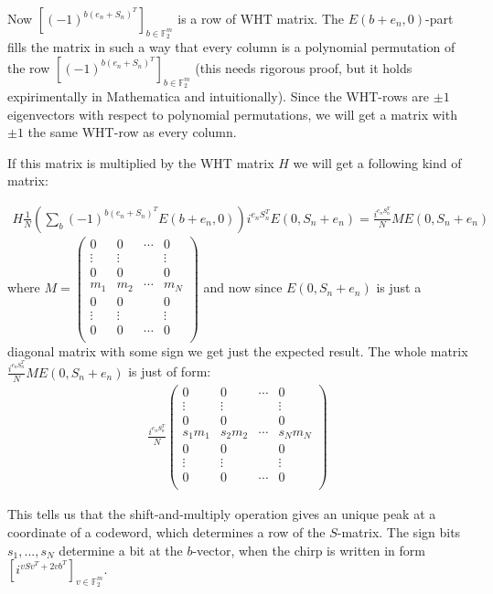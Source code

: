 \documentclass{article}
\begin{document}
	Now 
	$\left[(-1)^{b(e_n+S_n)^T}\right]_{b \in \mathbb{F}_2^m}$ is a row of WHT matrix. 
	The $E(b+e_n,0)$-part fills the matrix in such a way that every column is a polynomial permutation of the row $\left[(-1)^{b(e_n+S_n)^T}\right]_{b \in \mathbb{F}_2^m}$ (this needs rigorous proof, but it holds expirimentally in Mathematica and intuitionally). Since the WHT-rows are $\pm 1$ eigenvectors with respect to polynomial permutations, we will get a matrix with $\pm 1$ the same WHT-row as every column. \newpage 
	
	If this matrix is multiplied by the WHT matrix $H$ we will get a following kind of matrix:
	
	\begin{align*}
		H \frac{1}{N} \left(\sum_{b} (-1)^{b(e_n+S_n)^T} E(b+e_n, 0) \right) i^{e_nS_n^T}E(0, S_n + e_n) = \frac{i^{e_nS_n^T}}{N}ME(0, S_n + e_n)
	\end{align*}
	where $M = \begin{pmatrix} 0 & 0 & \cdots & 0 \\
		\vdots & \vdots &  & \vdots \\
		0 & 0 &  & 0 \\
		m_1 & m_2 & \cdots & m_N \\
		0 & 0 & & 0 \\
		\vdots & \vdots &  & \vdots \\
		0 & 0 & \cdots & 0 \\
	\end{pmatrix}$ and now since $E(0, S_n + e_n)$ is just a diagonal matrix with some sign we get just the expected result. The whole matrix $\frac{i^{e_nS_n^T}}{N}ME(0, S_n + e_n)$ is just of form:
	\begin{align*}
		\frac{i^{e_nS_n^T}}{N} \begin{pmatrix} 0 & 0 & \cdots & 0 \\
			\vdots & \vdots &  & \vdots \\
			0 & 0 &  & 0 \\
			s_1m_1 & s_2m_2 & \cdots & s_Nm_N \\
			0 & 0 & & 0 \\
			\vdots & \vdots &  & \vdots \\
			0 & 0 & \cdots & 0 \\
		\end{pmatrix}
	\end{align*}
	
	This tells us that the shift-and-multiply operation gives an unique peak at a coordinate of a codeword, which determines a row of the $S$-matrix. The sign bits $s_1,...,s_N$ determine a bit at the $b$-vector, when the chirp is written in form $\left[i^{vSv^T + 2vb^T}\right]_{v \in \mathbb{F}^m_2}$.
	
\end{document}
